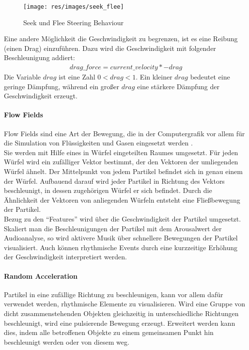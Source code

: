 \documentclass[11pt,a4paper]{article}
\begin{document}
\begin{figure}[ht!]
\centering
\texttt{[image: res/images/seek\_flee]}
\caption[Seek und Flee Steering Behaviour]{Seek und Flee Steering Behaviour
 \cite[S. 2]{580abc6c6615ef9f9c16f9069351938a0dda3c5120b7e8d1450d6b1abf0a71df}}
 \label{fig:seekflee}
\end{figure}
\noindent
Eine andere Möglichkeit die Geschwindigkeit zu begrenzen, ist es eine Reibung (einen Drag) einzuführen. Dazu wird die Geschwindigkeit mit folgender Beschleunigung addiert:
\begin{align}
drag\_force = current\_velocity * -drag
\end{align}
\noindent
Die Variable $drag$ ist eine Zahl $0 < drag < 1$. Ein kleiner $drag$ bedeutet eine geringe Dämpfung, während ein großer $drag$ eine stärkere Dämpfung der Geschwindigkeit erzeugt.

\paragraph{Flow Fields} Flow Fields sind eine Art der Bewegung, die in der Computergrafik vor allem für die Simulation von Flüssigkeiten und Gasen eingesetzt werden \cite{stam1999stable}.\\
Sie werden mit Hilfe eines in Würfel eingeteilten Raumes umgesetzt. Für jeden Würfel wird ein zufälliger Vektor bestimmt, der den Vektoren der umliegenden Würfel ähnelt. Der Mittelpunkt von jedem Partikel befindet sich in genau einem der Würfel. Aufbauend darauf wird jeder Partikel in Richtung des Vektors beschleunigt, in dessen zugehörigen Würfel er sich befindet. Durch die Ähnlichkeit der Vektoren von anliegenden Würfeln entsteht eine Fließbewegung der Partikel.\\
Bezug zu den ``Features'' wird über die Geschwindigkeit der Partikel umgesetzt. Skaliert man die Beschleunigungen der Partikel mit dem Arousalwert der Audioanalyse, so wird aktivere Musik über schnellere Bewegungen der Partikel visualisiert. Auch können rhythmische Events durch eine kurzzeitige Erhöhung der Geschwindigkeit interpretiert werden.

\paragraph{Random Acceleration}
Partikel in eine zufällige Richtung zu beschleunigen, kann vor allem dafür verwendet werden, rhythmische Elemente zu visualisieren. Wird eine Gruppe von dicht zusammenstehenden Objekten gleichzeitig in unterschiedliche Richtungen beschleunigt, wird eine pulsierende Bewegung erzeugt. Erweitert werden kann dies, indem alle betroffenen Objekte zu einem gemeinsamen Punkt hin beschleunigt werden oder von diesem weg.
\end{document}

